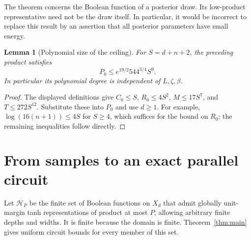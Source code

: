 \documentclass[11pt]{article}
\newtheorem{lemma}[theorem]{Lemma}
\theoremstyle{remark}
\begin{document}
The theorem concerns the Boolean function of a posterior draw. Its
low-product representative need not be the draw itself. In particular,
it would be incorrect to replace this result by an assertion that all
posterior parameters have small energy.

\begin{lemma}[Polynomial size of the ceiling]
\label{lem:ceiling-poly}
For $S=d+n+2$, the preceding product satisfies
\[
 P_0\le e^{19/2}544^{3/4}S^9.
\]
In particular its polynomial degree is independent of $L,\zeta,\beta$.
\end{lemma}
\begin{proof}
The displayed definitions give $C_0\le S$, $R_0\le4S^2$,
$M\le17S^7$, and $T\le272S^{12}$. Substitute these into $P_0$ and
use $d\ge1$. For example,
$\log(16(n+1))\le4S$ for $S\ge4$, which suffices for the bound on
$R_0$; the remaining inequalities follow directly.
\end{proof}

\section{From samples to an exact parallel circuit}
\label{sec:converse}

Let $\mathcal H_P$ be the finite set of Boolean functions on $X_d$
that admit globally unit-margin tanh representations of product at
most $P$, allowing arbitrary finite depths and widths. It is finite
because the domain is finite. Theorem~\ref{thm:main} gives uniform
circuit bounds for every member of this set.
\end{document}
